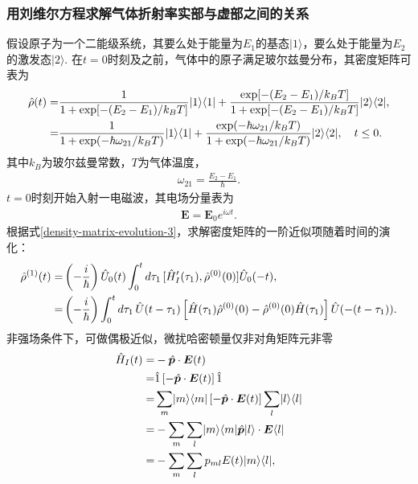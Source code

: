 \documentclass{assignment}
\begin{document}
\subsubsection{用刘维尔方程求解气体折射率实部与虚部之间的关系}
假设原子为一个二能级系统，其要么处于能量为$E_1$的基态$\lvert 1\rangle$，要么处于能量为$E_2$的激发态$\lvert 2\rangle$. 在$t=0$时刻及之前，气体中的原子满足玻尔兹曼分布，其密度矩阵可表为
\begin{align}
    \notag\hat{\rho}(t)=&\frac{1}{1+\exp[-(E_2-E_1)/k_BT]}\lvert 1\rangle\langle 1\rvert+\frac{\exp[-(E_2-E_1)/k_BT]}{1+\exp[-(E_2-E_1)/k_BT]}\lvert 2\rangle\langle 2\rvert,\\
    =&\frac{1}{1+\exp(-\hbar\omega_{21}/k_BT)}\lvert 1\rangle\langle 1\rvert+\frac{\exp(-\hbar\omega_{21}/k_BT)}{1+\exp(-\hbar\omega_{21}/k_BT)}\lvert 2\rangle\langle 2\rvert,\quad t\leq 0.
\end{align}
其中$k_B$为玻尔兹曼常数，$T$为气体温度，
\begin{align}
    \omega_{21}=\frac{E_2-E_1}{\hbar}.
\end{align}
$t=0$时刻开始入射一电磁波，其电场分量表为
\begin{align}
    \bm{E}=\bm{E}_0e^{i\omega t}.
\end{align}
根据式\eqref{density-matrix-evolution-3}，求解密度矩阵的一阶近似项随着时间的演化：
\begin{align}
    \label{density-matrix-evolution-4}
    \notag\hat{\rho}^{(1)}(t)=&\left(-\frac{i}{\hbar}\right)\hat{U}_0(t)\int_0^td\tau_1\,[\hat{H}_I'(\tau_1),\hat{\rho}^{(0)}(0)]\hat{U}_0(-t),\\
    =&\left(-\frac{i}{\hbar}\right)\int_0^td\tau_1\,\hat{U}(t-\tau_1)\left[\hat{H}(\tau_1)\hat{\rho}^{(0)}(0)-\hat{\rho}^{(0)}(0)\hat{H}(\tau_1)\right]\hat{U}(-(t-\tau_1)).
\end{align}
非强场条件下，可做偶极近似，微扰哈密顿量仅非对角矩阵元非零
\begin{align}
    \notag\hat{H}_I(t)=&-\hat{\bm{p}}\cdot\bm{E}(t)\\
    \notag=&\hat{1}\left[-\hat{\bm{p}}\cdot\bm{E}(t)\right]\hat{1}\\
    \notag=&\sum_m\lvert m\rangle\langle m\rvert\left[-\hat{\bm{p}}\cdot\bm{E}(t)\right]\sum_l\lvert l\rangle\langle l\rvert\\
    \notag=&-\sum_m\sum_l\lvert m\rangle\langle m\rvert\hat{\bm{p}}\lvert l\rangle\cdot\bm{E}\langle l\rvert\\
    =&-\sum_m\sum_lp_{ml}E(t)\lvert m\rangle\langle l\rvert,
\end{align}
\end{document}
